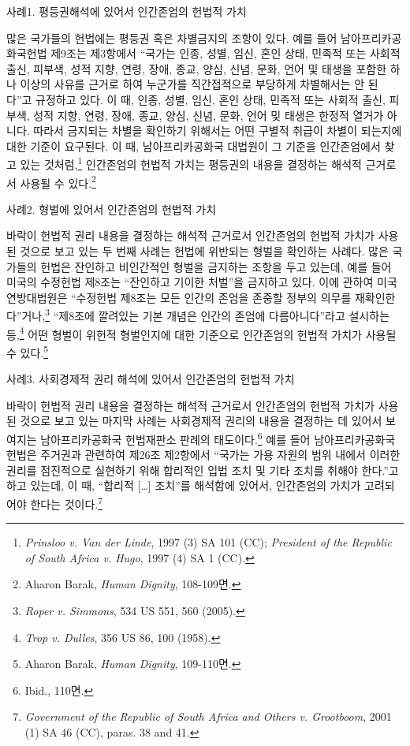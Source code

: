 사례1. 평등권해석에 있어서 인간존엄의 헌법적 가치

많은 국가들의 헌법에는 평등권 혹은 차별금지의 조항이 있다. 예를 들어 남아프리카공화국헌법 제9조는 제3항에서 ``국가는 인종, 성별, 임신, 혼인 상태, 민족적 또는 사회적 출신, 피부색, 성적 지향, 연령, 장애, 종교, 양심, 신념, 문화, 언어 및 태생을 포함한 하나 이상의 사유를 근거로 하여 누군가를 직간접적으로 부당하게 차별해서는 안 된다''고 규정하고 있다. 이 때, 인종, 성별, 임신, 혼인 상태, 민족적 또는 사회적 출신, 피부색, 성적 지향, 연령, 장애, 종교, 양심, 신념, 문화, 언어 및 태생은 한정적 열거가 아니다. 따라서 금지되는 차별을 확인하기 위해서는 어떤 구별적 취급이 차별이 되는지에 대한 기준이 요구된다. 이 때, 남아프리카공화국 대법원이 그 기준을 인간존엄에서 찾고 있는 것처럼,\footnote{\emph{Prinsloo v. Van der Linde}, 1997 (3) SA 101 (CC); \emph{President of the Republic of South Africa v. Hugo}, 1997 (4) SA 1 (CC).} 인간존엄의 헌법적 가치는 평등권의 내용을 결정하는 해석적 근거로서 사용될 수 있다.\footnote{Aharon Barak, \emph{Human Dignity}, 108-109면.}

사례2. 형벌에 있어서 인간존엄의 헌법적 가치

바락이 헌법적 권리 내용을 결정하는 해석적 근거로서 인간존엄의 헌법적 가치가 사용된 것으로 보고 있는 두 번째 사례는 헌법에 위반되는 형벌을 확인하는 사례다. 많은 국가들의 헌법은 잔인하고 비인간적인 형벌을 금지하는 조항을 두고 있는데, 예를 들어 미국의 수정헌법 제8조는 ``잔인하고 기이한 처벌''을 금지하고 있다. 이에 관하여 미국연방대법원은 ``수정헌법 제8조는 모든 인간의 존엄을 존중할 정부의 의무를 재확인한다''거나,\footnote{\emph{Roper v. Simmons}, 534 US 551, 560 (2005).} ``제8조에 깔려있는 기본 개념은 인간의 존엄에 다름아니다''라고 설시하는 등,\footnote{\emph{Trop v. Dulles}, 356 US 86, 100 (1958).} 어떤 형벌이 위헌적 형벌인지에 대한 기준으로 인간존엄의 헌법적 가치가 사용될 수 있다.\footnote{Aharon Barak, \emph{Human Dignity}, 109-110면.}

사례3. 사회경제적 권리 해석에 있어서 인간존엄의 헌법적 가치

바락이 헌법적 권리 내용을 결정하는 해석적 근거로서 인간존엄의 헌법적 가치가 사용된 것으로 보고 있는 마지막 사례는 사회경제적 권리의 내용을 결정하는 데 있어서 보여지는 남아프리카공화국 헌법재판소 판례의 태도이다.\footnote{Ibid., 110면.} 예를 들어 남아프리카공화국헌법은 주거권과 관련하여 제26조 제2항에서 ``국가는 가용 자원의 범위 내에서 이러한 권리를 점진적으로 실현하기 위해 합리적인 입법 조치 및 기타 조치를 취해야 한다.''고 하고 있는데, 이 때, ``합리적 {[}\ldots{]} 조치''를 해석함에 있어서, 인간존엄의 가치가 고려되어야 한다는 것이다.\footnote{\emph{Government of the Republic of South Africa and Others v. Grootboom}, 2001 (1) SA 46 (CC), paras. 38 and 41.}

